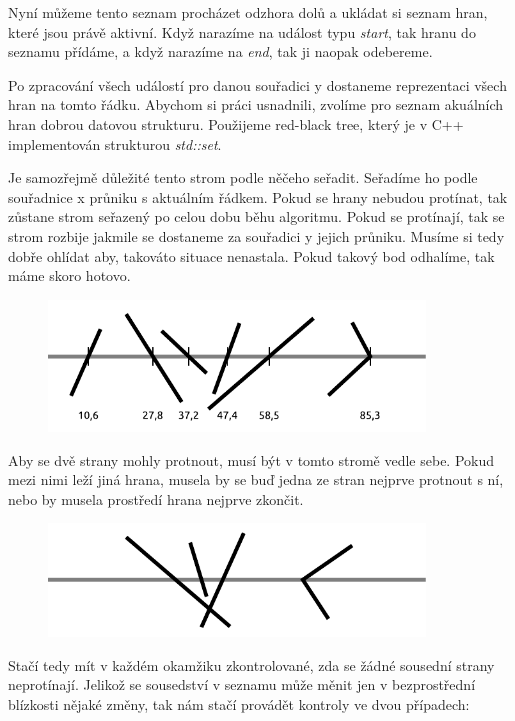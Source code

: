 \documentclass{article}
\begin{document}
Nyní můžeme tento seznam procházet odzhora dolů a ukládat si seznam hran, které jsou právě aktivní. Když narazíme na událost typu \emph{start}, tak hranu do seznamu přídáme, a když narazíme na \emph{end}, tak ji naopak odebereme.

Po zpracování všech událostí pro danou souřadici y dostaneme reprezentaci všech hran na tomto řádku. Abychom si práci usnadnili, zvolíme pro seznam akuálních hran dobrou datovou strukturu. Použijeme red-black tree, který je v C++ implementován strukturou \emph{std::set}.

Je samozřejmě důležité tento strom podle něčeho seřadit. Seřadíme ho podle souřadnice x průniku s aktuálním řádkem. Pokud se hrany nebudou protínat, tak zůstane strom seřazený po celou dobu běhu algoritmu. Pokud se protínají, tak se strom rozbije jakmile se dostaneme za souřadici y jejich průniku. Musíme si tedy dobře ohlídat aby, takováto situace nenastala. Pokud takový bod odhalíme, tak máme skoro hotovo.

\begin{figure}[h] \centering
    \includegraphics[width=10cm]{images/line.000.pdf}
\end{figure}

Aby se dvě strany mohly protnout, musí být v tomto stromě vedle sebe. Pokud mezi nimi leží jiná hrana, musela by se buď jedna ze stran nejprve protnout s ní, nebo by musela prostředí hrana nejprve zkončit.

\begin{figure}[h] \centering
    \includegraphics[width=10cm]{images/line.001.pdf}
\end{figure}

Stačí tedy mít v každém okamžiku zkontrolované, zda se žádné sousední strany neprotínají. Jelikož se sousedství v seznamu může měnit jen v bezprostřední blízkosti nějaké změny, tak nám stačí provádět kontroly ve dvou případech:
\end{document}
